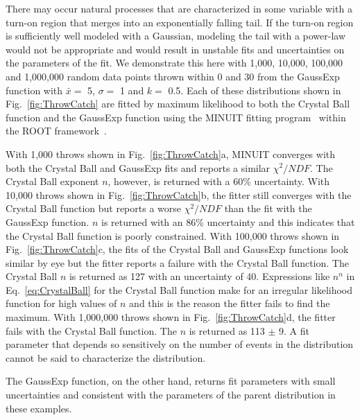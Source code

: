 \documentclass[10pt,letterpaper]{article}
\begin{document}
There may occur natural processes that are characterized in some variable with a turn-on region that merges into an exponentially falling tail. If the turn-on region is sufficiently well modeled with a Gaussian, modeling the tail with a power-law would not be appropriate and would result in unstable fits and uncertainties on the parameters of the fit. We demonstrate this here with 1,000, 10,000, 100,000 and 1,000,000 random data points thrown within 0 and 30 from the GaussExp function with $\bar{x} =$ 5, $\sigma =$ 1 and $k =$ 0.5. Each of these distributions shown in Fig.~\ref{fig:ThrowCatch} are fitted by maximum likelihood to both the Crystal Ball function and the GaussExp function using the MINUIT fitting program~\cite{JAMES1975343} within the ROOT framework~\cite{Antcheva20092499}.

With 1,000 throws shown in Fig.~\ref{fig:ThrowCatch}a, MINUIT converges with both the Crystal Ball and GaussExp fits and reports a similar $\chi^2/NDF$. The Crystal Ball exponent $n$, however, is returned with a 60\% uncertainty. With 10,000 throws shown in Fig.~\ref{fig:ThrowCatch}b, the fitter still converges with the Crystal Ball function but reports a worse $\chi^2/NDF$ than the fit with the GaussExp function. $n$ is returned with an 86\% uncertainty and this indicates that the Crystal Ball function is poorly constrained. With 100,000 throws shown in Fig.~\ref{fig:ThrowCatch}c, the fits of the Crystal Ball and GaussExp functions look similar by eye but the fitter reports a failure with the Crystal Ball function. The Crystal Ball $n$ is returned as 127 with an uncertainty of 40. Expressions like $n^n$ in Eq.~\ref{eq:CrystalBall} for the Crystal Ball function make for an irregular likelihood function for high values of $n$ and this is the reason the fitter fails to find the maximum. With 1,000,000 throws shown in Fig.~\ref{fig:ThrowCatch}d, the fitter fails with the Crystal Ball function. The $n$ is returned as 113 $\pm$ 9. A fit parameter that depends so sensitively on the number of events in the distribution cannot be said to characterize the distribution. 

The GaussExp function, on the other hand, returns fit parameters with small uncertainties and consistent with the parameters of the parent distribution in these examples.

\end{document}
